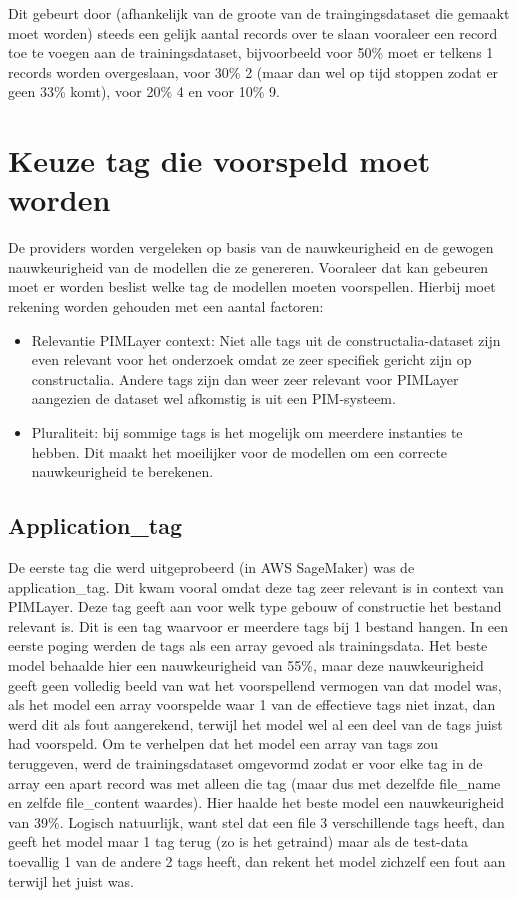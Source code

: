 Dit gebeurt door (afhankelijk van de groote van de traingingsdataset die gemaakt moet worden) steeds een gelijk aantal records over te slaan vooraleer een record toe te voegen aan de trainingsdataset, bijvoorbeeld voor 50\% moet er telkens 1 records worden overgeslaan, voor 30\% 2 (maar dan wel op tijd stoppen zodat er geen 33\% komt), voor 20\% 4 en voor 10\% 9.


\section{Keuze tag die voorspeld moet worden}
De providers worden vergeleken op basis van de nauwkeurigheid en de gewogen nauwkeurigheid van de modellen die ze genereren. Vooraleer dat kan gebeuren moet er worden beslist welke tag de modellen moeten voorspellen. Hierbij moet rekening worden gehouden met een aantal factoren:
\begin{itemize}
    \item Relevantie PIMLayer context: Niet alle tags uit de constructalia-dataset zijn even relevant voor het onderzoek omdat ze zeer specifiek gericht zijn op constructalia. Andere tags zijn dan weer zeer relevant voor PIMLayer aangezien de dataset wel afkomstig is uit een PIM-systeem.
    \item Pluraliteit: bij sommige tags is het mogelijk om meerdere instanties te hebben. Dit maakt het moeilijker voor de modellen om een correcte nauwkeurigheid te berekenen. 
\end{itemize}

\subsection{Application\_tag}
De eerste tag die werd uitgeprobeerd (in AWS SageMaker) was de application\_tag. Dit kwam vooral omdat deze tag zeer relevant is in context van PIMLayer. Deze tag geeft aan voor welk type gebouw of constructie het bestand relevant is. Dit is een tag waarvoor er meerdere tags bij 1 bestand hangen. In een eerste poging werden de tags als een array gevoed als trainingsdata. Het beste model behaalde hier een nauwkeurigheid van 55\%, maar deze nauwkeurigheid geeft geen volledig beeld van wat het voorspellend vermogen van dat model was, als het model een array voorspelde waar 1 van de effectieve tags niet inzat, dan werd dit als fout aangerekend, terwijl het model wel al een deel van de tags juist had voorspeld. Om te verhelpen dat het model een array van tags zou teruggeven, werd de trainingsdataset omgevormd zodat er voor elke tag in de array een apart record was met alleen die tag (maar dus met dezelfde file\_name en zelfde file\_content waardes). Hier haalde het beste model een nauwkeurigheid van  39\%. Logisch natuurlijk, want stel dat een file 3 verschillende tags heeft, dan geeft het model maar 1 tag terug (zo is het getraind) maar als de test-data toevallig 1 van de andere 2 tags heeft, dan rekent het model zichzelf een fout aan terwijl het juist was. 

